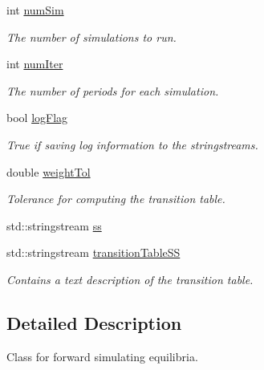 \begin{DoxyCompactItemize}
int \hyperlink{classSGSimulator_a47c69f11d6f8f3b9a67c74eb7c31b813}{num\+Sim}
\begin{DoxyCompactList}\small\item\em The number of simulations to run. \end{DoxyCompactList}\item 
\mbox{\label{classSGSimulator_aad0eefe29ca6df736afb9ed31be28324}} 
int \hyperlink{classSGSimulator_aad0eefe29ca6df736afb9ed31be28324}{num\+Iter}
\begin{DoxyCompactList}\small\item\em The number of periods for each simulation. \end{DoxyCompactList}\item 
\mbox{\label{classSGSimulator_a0db92027408d6b779bd391766d12673d}} 
bool \hyperlink{classSGSimulator_a0db92027408d6b779bd391766d12673d}{log\+Flag}
\begin{DoxyCompactList}\small\item\em True if saving log information to the stringstreams. \end{DoxyCompactList}\item 
\mbox{\label{classSGSimulator_a1093e2e6528ff92e68126289d9511d92}} 
double \hyperlink{classSGSimulator_a1093e2e6528ff92e68126289d9511d92}{weight\+Tol}
\begin{DoxyCompactList}\small\item\em Tolerance for computing the transition table. \end{DoxyCompactList}\item 
std\+::stringstream \hyperlink{classSGSimulator_af2f15fbb5e900408947007367b650153}{ss}
\item 
\mbox{\label{classSGSimulator_a9c28c996c061390940daa5529c577c2b}} 
std\+::stringstream \hyperlink{classSGSimulator_a9c28c996c061390940daa5529c577c2b}{transition\+Table\+SS}
\begin{DoxyCompactList}\small\item\em Contains a text description of the transition table. \end{DoxyCompactList}\end{DoxyCompactItemize}


\subsection{Detailed Description}
Class for forward simulating equilibria. 

